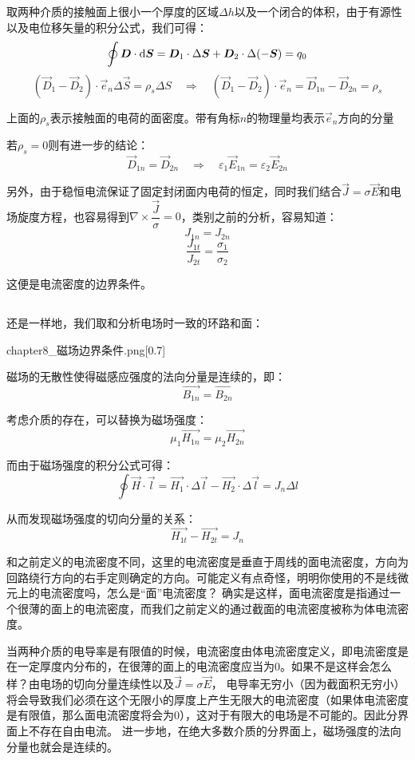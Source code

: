 取两种介质的接触面上很小一个厚度的区域$\Delta h$以及一个闭合的体积，由于有源性以及电位移矢量的积分公式，我们可得：
\[\oint \vec{D}\cdot\dif{\vec{S}}=\vec{D}_1\cdot\Delta\vec{S}+\vec{D}_2\cdot\Delta (-\vec{S})=q_0\]
\[(\vec{D}_1-\vec{D}_2)\cdot\vec{e}_n\Delta\vec{S}=\rho_s \Delta S\quad\Rightarrow\quad(\vec{D}_1-\vec{D}_2)\cdot\vec{e}_n =\vec{D}_{1n}-\vec{D}_{2n}=\rho_s\]

上面的$\rho_s$表示接触面的电荷的面密度。带有角标$n$的物理量均表示$\vec{e}_n$方向的分量

若$\rho_s = 0$则有进一步的结论：
\[\vec{D}_{1n} =\vec{D}_{2n}\quad\Rightarrow\quad\varepsilon_1 \vec{E}_{1n}=\varepsilon_2 \vec{E}_{2n}\]

另外，由于稳恒电流保证了固定封闭面内电荷的恒定，同时我们结合$\vec{J} = \sigma\vec{E}$和电场旋度方程，也容易得到$\nabla \times \dfrac{\vec{J}}{\sigma} = 0$，类别之前的分析，容易知道：
\[J_{1n} = J_{2n}\]
\[\dfrac{J_{1t}}{J_{2t}} = \dfrac{\sigma_1}{\sigma_2}\]

这便是电流密度的边界条件。
\subsection[磁场边界条件]{}
还是一样地，我们取和分析电场时一致的环路和面：
\begin{singlefigure}[磁场边界条件]{chapter8_磁场边界条件.png}[0.7]
\end{singlefigure}

磁场的无散性使得磁感应强度的法向分量是连续的，即：
\[\vec{B_{1n}} = \vec{B_{2n}}\]

考虑介质的存在，可以替换为磁场强度：
\[\mu_1\vec{H_{1n}} = \mu_2\vec{H_{2n}}\]

而由于磁场强度的积分公式可得：
\[\oint \vec{H}\cdot\vec{l} = \vec{H_1}\cdot\Delta\vec{l} - \vec{H_2}\cdot\Delta\vec{l} = J_n \Delta l\]

从而发现磁场强度的切向分量的关系：
\[\vec{H_{1t}} - \vec{H_{2t}} = J_n\]

和之前定义的电流密度不同，这里的电流密度是垂直于周线的面电流密度，方向为回路绕行方向的右手定则确定的方向。可能定义有点奇怪，明明你使用的不是线微元上的电流密度吗，怎么是“面”电流密度？
确实是这样，面电流密度是指通过一个很薄的面上的电流密度，而我们之前定义的通过截面的电流密度被称为体电流密度。

当两种介质的电导率是有限值的时候，电流密度由体电流密度定义，即电流密度是在一定厚度内分布的，在很薄的面上的电流密度应当为0。如果不是这样会怎么样？由电场的切向分量连续性以及$\vec{J} = \sigma\vec{E}$，
电导率无穷小（因为截面积无穷小）将会导致我们必须在这个无限小的厚度上产生无限大的电流密度（如果体电流密度是有限值，那么面电流密度将会为0），这对于有限大的电场是不可能的。因此分界面上不存在自由电流。
进一步地，在绝大多数介质的分界面上，磁场强度的法向分量也就会是连续的。

